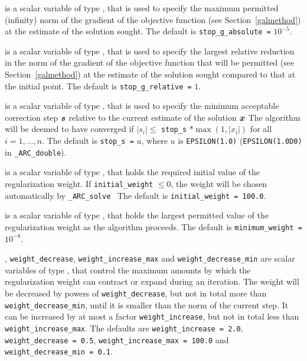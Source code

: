 \documentclass{galahad}
\newcommand{\packagename}{ARC}
\newcommand{\fullpackagename}{\libraryname\_\packagename}
\newcommand{\solver}{{\tt \fullpackagename\_solve}}
\begin{document}
\begin{description}
 is a scalar variable of type \realdp,
that is used to specify the maximum permitted (infinity)
norm of the gradient of the objective function
(see Section~\ref{galmethod}) at the estimate of the solution sought.
The default is {\tt stop\_g\_absolute =} $10^{-5}$.

 is a scalar variable of type \realdp,
that is used to specify the largest relative reduction in the norm of the
gradient of the objective function that will be permitted
(see Section~\ref{galmethod}) at the estimate of the solution sought
compared to that at the initial point.
The default is {\tt stop\_g\_relative =} $1$.

 is a scalar variable of type \realdp,
that is used to specify the minimum acceptable correction step ${\bm{s}}$
relative to the current estimate of the solution ${\bm{x}}$
The algorithm will be deemed to have converged if $|s_i| \leq$
{\tt stop\_s} $\ast \max( 1, |x_i|)$ for all $i = 1, \ldots, n$.
The default is {\tt stop\_s =} $u$,
where $u$ is {\tt EPSILON(1.0)} ({\tt EPSILON(1.0D0)} in
{\tt \fullpackagename\_double}).

 is a scalar variable of type \realdp, that holds
the required initial value of the regularization weight. If
{\tt initial\_weight} $\leq 0$, the weight will be chosen automatically
by \solver\
The default is {\tt initial\_weight = 100.0}.

 is a scalar variable of type \realdp, that holds
the largest permitted value of the regularization weight as the algorithm
proceeds.
The default is {\tt minimum\_weight =} $10^{-8}$.

,
{\tt weight\_decrease},
{\tt weight\_increase\_max}
and
{\tt weight\_decrease\_min}
are scalar variables of type \realdp, that
control the maximum amounts by which the regularization weight can
contract or expand during an iteration. The weight will be decreased by
powers of {\tt weight\_decrease}, but not in total
more than  {\tt weight\_decrease\_min}, until it is smaller than the norm of
the current step.
It can be increased by at most a factor {\tt weight\_increase}, but not
in total less than {\tt weight\_increase\_max}.
The defaults are
{\tt weight\_increase = 2.0},
{\tt weight\_decrease = 0.5},
{\tt weight\_incr\-ease\_max = 100.0} and
{\tt weight\_decrease\_min = 0.1}.


\end{description}
\end{document}
